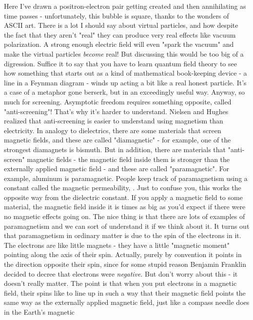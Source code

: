 Here I've drawn a positron-electron pair getting created and then
annihilating as time passes - unfortunately, this bubble is square,
thanks to the wonders of ASCII art.  
There is a lot I should say about virtual particles, and how despite
the fact that they aren't "real" they can produce very real effects
like vacuum polarization.  A strong enough electric field will even
"spark the vacuum" and make the virtual particles \emph{become} 
real!  But 
discussing this would be too big of a digression.  Suffice it to say 
that you have to learn quantum field theory to see how something that 
starts out as a kind of mathematical book-keeping device - a line in a 
Feynman diagram - winds up acting a bit like a real honest particle.  
It's a case of a metaphor gone berserk, but in an exceedingly useful way.
Anyway, so much for screening.   Asymptotic freedom requires something 
opposite, called "anti-screening"!   That's why it's harder to understand.
Nielsen and Hughes realized that anti-screening is easier to understand
using magnetism than electricity.   In analogy to dielectrics, there
are some materials that screen magnetic fields, and these are called
"diamagnetic" - for example, one of the strongest diamagnets is bismuth.
But in addition, there are materials that "anti-screen" magnetic fields -
the magnetic field inside them is stronger than the externally applied
magnetic field - and these are called "paramagnetic".  For example,
aluminum is paramagnetic.  People keep track of paramagnetism using
a constant called the magnetic permeability, \mu .  Just to confuse you,
this works the opposite way from the dielectric constant.  If you
apply a magnetic field to some material, the magnetic field inside it is 
\mu  times as big as you'd expect if there were no magnetic effects going
on.   
The nice thing is that there are lots of examples of paramagnetism
and we can sort of understand it if we think about it.   It turns
out that paramagnetism in ordinary matter is due to the spin of the 
electrons in it.  The electrons are like little magnets - they
have a little "magnetic moment" pointing along the axis of their spin.
Actually, purely by convention it points in the direction opposite
their spin, since for some stupid reason Benjamin Franklin decided
to decree that electrons were \emph{negative}.  But don't worry about this -
it doesn't really matter.  The point is that when you put electrons in a
magnetic field, their spins like to line up in such a way that
their magnetic field points the same way as the externally applied
magnetic field, just like a compass needle does in the Earth's magnetic
